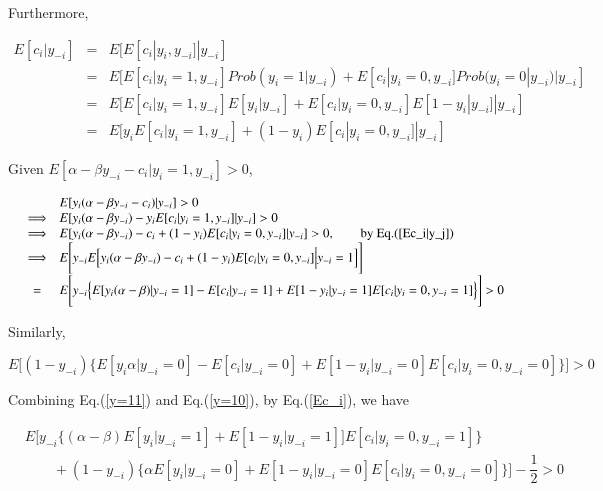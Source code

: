 \documentclass[draft]{article}
\begin{document}
Furthermore,

\begin{equation}
\begin{array}{rcl}
    E[c_i|y_{-i}] 
&=& E[E[c_i|y_i, y_{-i}]|y_{-i}]\\
&=& E[E[c_i|y_i = 1, y_{-i}]Prob(y_i = 1 | y_{-i}) + E[c_i|y_i = 0, y_{-i}]Prob(y_i = 0 | y_{-i})|y_{-i}]\\
&=& E[E[c_i|y_i = 1, y_{-i}]E[y_i | y_{-i}] + E[c_i|y_i = 0, y_{-i}]E[1 - y_i | y_{-i}]|y_{-i}] \\
&=& E[y_iE[c_i|y_i = 1, y_{-i}] + (1 - y_i)E[c_i|y_i = 0, y_{-i}]|y_{-i}]
\end{array}
\label{Ec_i|y_j}
\end{equation}

Given $E[\alpha - \beta y_{-i} - c_i|y_i = 1, y_{-i}] > 0$, 

\begin{equation}
    \begin{array}{rcl}
        &&     E[y_i(\alpha - \beta y_{-i} - c_i)|y_{-i}] > 0 \\
        & \Longrightarrow & E[y_i(\alpha - \beta y_{-i}) - y_iE[c_i|y_i = 1, y_{-i}]|y_{-i}] > 0 \\
        & \Longrightarrow & E[y_i(\alpha - \beta y_{-i}) - c_i + (1 - y_i)E[c_i|y_i = 0, y_{-i}]|y_{-i}] > 0, \qquad \mbox{by Eq.(\ref{Ec_i|y_j})}\\
        & \Longrightarrow & E\Bigg[y_{-i}E\Big[y_i(\alpha - \beta y_{-i}) - c_i + (1 - y_i)E[c_i|y_i = 0, y_{-i}]\Big|y_{-i} = 1\Big]\Bigg] \\
        & = & E\Bigg[y_{-i}\Big\{E[y_i(\alpha - \beta)|y_{-i} = 1] - E[c_i|y_{-i} = 1] + E[1 - y_i|y_{-i} = 1]E[c_i|y_i = 0, y_{-i} = 1]\Big\}\Bigg] > 0
\end{array}
\label{y=11}
\end{equation}


Similarly,

\begin{equation}
E\Bigg[(1 - y_{-i})\Big\{E[y_i\alpha|y_{-i} = 0] - E[c_i|y_{-i} = 0] + E[1 - y_i|y_{-i} = 0]E[c_i|y_i = 0, y_{-i} = 0]\Big\}\Bigg] > 0
\label{y=10}
\end{equation}


Combining Eq.(\ref{y=11}) and Eq.(\ref{y=10}), by Eq.(\ref{Ec_i}), we have

\begin{equation}
\begin{array}{rl}
    & E\Bigg[y_{-i}\Big\{(\alpha - \beta)E[y_i|y_{-i} = 1] + E[1 - y_i|y_{-i} = 1]]E[c_i|y_i = 0, y_{-i} = 1] \Big\}   \\
    & \qquad + (1 - y_{-i})\Big\{\alpha E[y_i|y_{-i} = 0] + E[1 - y_i|y_{-i} = 0]E[c_i|y_i = 0, y_{-i} = 0]\Big\}\Bigg] - \dfrac{1}{2}> 0 
\end{array}
\end{equation}
\end{document}
